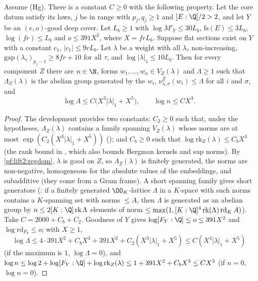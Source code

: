 \begin{proposition}\label{pf:lift2:shortgen}
Assume \textup{(Hg)}. There is a constant $C\ge0$ with the following property. Let the core datum satisfy its laws, $j$ be in
range with $p_j,q_j\ge1$ and $[E:\Q]/2>2$, and let $Y$ be an $(e,o)$-good deep cover. Let $L_b\ge1$ with $\log M'_Y\le30L_b$,
$\mathrm{fs}(E)\le3L_b$, $\log(fr)\le L_b$ and $o\le391X^2$, where $X=frL_b$. Suppose flat sections exist on $Y$ with a
constant $c_1$, $|c_1|\le9rL_b$. Let $\lambda$ be a weight with all $\lambda_\tau$ non-increasing,
$\mathrm{gap}(\lambda_\tau)_{p_j-1}\ge8fr+10$ for all $\tau$, and $\log|\lambda|_1\le10L_b$. Then for every component $Z$ there
are $n\in\N$, forms $w_1,\dots,w_n\in V_Z(\lambda)$ and $\Lambda\ge1$ such that $\Lambda_Z(\lambda)$ is the abelian group
generated by the $w_i$, $\nu^Z_{\lambda,\sigma}(w_i)\le\Lambda$ for all $i$ and $\sigma$, and
\[
\log\Lambda\le C\bigl(X^3|\lambda|_1+X^5\bigr),\qquad \log n\le CX^3 .
\]
\end{proposition}

\begin{proof}
The development provides two constants: $C_2\ge0$ such that, under the hypotheses, $\Lambda_Z(\lambda)$ contains a family
spanning $V_Z(\lambda)$ whose norms are at most $\exp(C_2(X^3|\lambda|_1+X^5))$
(); and $C_b\ge0$ such that $\log\mathrm{rk}_Z(\lambda)\le C_bX^3$
(the rank bound in , which also bounds Bergman kernels and sup
norms). By \cref{pf:lift2:regdom}, $\lambda$ is good on $Z$, so $\Lambda_Z(\lambda)$ is finitely generated, the norms are
non-negative, homogeneous for the absolute values of the embeddings, and subadditive (they come from a Gram frame). A
short spanning family gives short generators (:
if a finitely generated $\OO_K$-lattice $\Lambda$ in a $K$-space with such norms contains a $K$-spanning set with norms
$\le A$, then $\Lambda$ is generated as an abelian group by $n\le2[K:\Q]\lifttwork\Lambda$ elements of norm
$\le\max(1,[K:\Q]^4\lifttwork(\Lambda)\,\mathrm{rd}_K\,A)$). Take $C=2000+C_b+C_2$. Goodness of $Y$ gives
$\log[F_Y:\Q]\le o\le391X^2$ and $\log\mathrm{rd}_{F_Y}\le o$; with $X\ge1$,
\[
\log\Lambda\le4\cdot391X^2+C_bX^3+391X^2+C_2(X^3|\lambda|_1+X^5)\le C(X^3|\lambda|_1+X^5)
\]
(if the maximum is $1$, $\log\Lambda=0$), and $\log n\le\log2+\log[F_Y:\Q]+\log\mathrm{rk}_Z(\lambda)\le1+391X^2+C_bX^3\le
CX^3$ (if $n=0$, $\log n=0$).
\end{proof}

